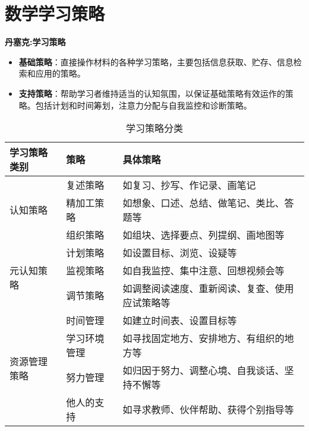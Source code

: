 \chapter{数学学习策略}


\textbf{丹塞克:学习策略}
\begin{itemize}
    \item \textbf{基础策略}：直接操作材料的各种学习策略，主要包括信息获取、贮存、信息检索和应用的策略。
    \item \textbf{支持策略}：帮助学习者维持适当的认知氛围，以保证基础策略有效运作的策略。包括计划和时间筹划，注意力分配与自我监控和诊断策略。
\end{itemize}


\begin{table}[h]
    \centering
    \caption{学习策略分类}
    \begin{tabular}{m{3cm}m{3cm}m{6cm}}
        \toprule
        \textbf{学习策略类别} & \textbf{策略} & \textbf{具体策略} \\
        \midrule
        \multirow{3}{*}{认知策略} 
        & 复述策略 & 如复习、抄写、作记录、画笔记 \\
        & 精加工策略 & 如想象、口述、总结、做笔记、类比、答题等 \\
        & 组织策略 & 如组块、选择要点、列提纲、画地图等 \\
        \midrule
        \multirow{3}{*}{元认知策略}
        & 计划策略 & 如设置目标、浏览、设疑等 \\
        & 监视策略 & 如自我监控、集中注意、回想视频会等 \\
        & 调节策略 & 如调整阅读速度、重新阅读、复查、使用应试策略等 \\
        \midrule
        \multirow{4}{*}{资源管理策略}
        & 时间管理 & 如建立时间表、设置目标等 \\
        & 学习环境管理 & 如寻找固定地方、安排地方、有组织的地方等 \\
        & 努力管理 & 如归因于努力、调整心境、自我谈话、坚持不懈等 \\
        & 他人的支持 & 如寻求教师、伙伴帮助、获得个别指导等 \\
        \bottomrule
    \end{tabular}
\end{table}

